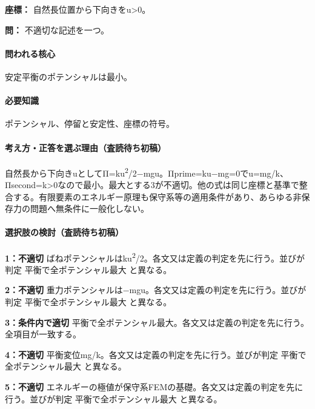 \noindent\textbf{座標：} 自然長位置から下向きをu>0。\par

\noindent\textbf{問：} 不適切な記述を一つ。\par

\paragraph{問われる核心} 安定平衡のポテンシャルは最小。

\paragraph{必要知識} ポテンシャル、停留と安定性、座標の符号。

\paragraph{考え方・正答を選ぶ理由（査読待ち初稿）} 自然長から下向きuとしてΠ=ku\textsuperscript{2}/2−mgu。Πprime=\allowbreak{}ku−mg=\allowbreak{}0でu=\allowbreak{}mg/k、Πsecond=\allowbreak{}k>0なので最小。最大とする3が不適切。他の式は同じ座標と基準で整合する。有限要素のエネルギー原理も保守系等の適用条件があり、あらゆる非保存力の問題へ無条件に一般化しない。

\paragraph{選択肢の検討（査読待ち初稿）}\mbox{}\par

\noindent\textbf{1：不適切} ばねポテンシャルはku\textsuperscript{2}/2。各文又は定義の判定を先に行う。並びが判定 平衡で全ポテンシャル最大 と異なる。\par

\noindent\textbf{2：不適切} 重力ポテンシャルは−mgu。各文又は定義の判定を先に行う。並びが判定 平衡で全ポテンシャル最大 と異なる。\par

\noindent\textbf{3：条件内で適切} 平衡で全ポテンシャル最大。各文又は定義の判定を先に行う。全項目が一致する。\par

\noindent\textbf{4：不適切} 平衡変位mg/k。各文又は定義の判定を先に行う。並びが判定 平衡で全ポテンシャル最大 と異なる。\par

\noindent\textbf{5：不適切} エネルギーの極値が保守系FEMの基礎。各文又は定義の判定を先に行う。並びが判定 平衡で全ポテンシャル最大 と異なる。\par

